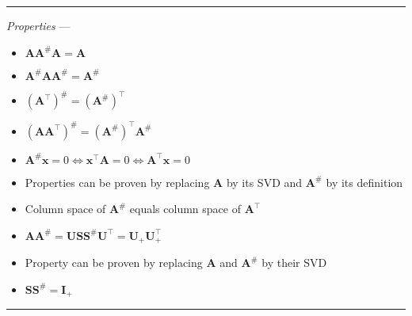 {\color{lightgray}\hrule height 0.001mm}

\emph{Properties} --- 
\begin{multicols}{2}
\begin{itemize}
    \item $\boldsymbol{A}\boldsymbol{A}^{\#}\boldsymbol{A} = \boldsymbol{A}$
    \item $\boldsymbol{A}^{\#}\boldsymbol{A}\boldsymbol{A}^{\#} = \boldsymbol{A}^{\#}$
    \item $(\boldsymbol{A}^\intercal)^{\#} = (\boldsymbol{A}^{\#})^\intercal$
    \item $(\boldsymbol{A}\boldsymbol{A}^\intercal)^{\#} = (\boldsymbol{A}^{\#})^\intercal\boldsymbol{A}^{\#}$
    \item $\boldsymbol{A}^{\#} \boldsymbol{x} = 0 \Leftrightarrow \boldsymbol{x}^\intercal \boldsymbol{A} = 0 \Leftrightarrow \boldsymbol{A}^\intercal \boldsymbol{x} = 0$
    \item Properties can be proven by replacing $\boldsymbol{A}$ by its SVD and $\boldsymbol{A}^{\#}$ by its definition
    \item Column space of $\boldsymbol{A}^{\#}$ equals column space of 
    $\boldsymbol{A}^\intercal$
    \item $\boldsymbol{A}\boldsymbol{A}^{\#} = \boldsymbol{U}\boldsymbol{S}\boldsymbol{S}^{\#}\boldsymbol{U}^\intercal = \boldsymbol{U}_+\boldsymbol{U}_+^\intercal$ 
    \item Property can be proven by replacing $\boldsymbol{A}$ and $\boldsymbol{A}^{\#}$ by their SVD 
    \item $\boldsymbol{S}\boldsymbol{S}^{\#} = \boldsymbol{I}_+$
\end{itemize}
\end{multicols}

{\color{black}\hrule height 0.001mm}

